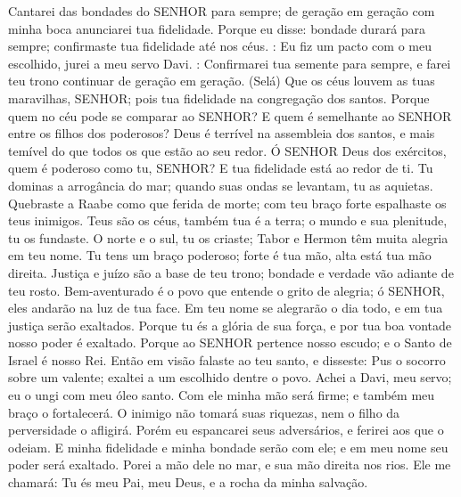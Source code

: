 
{\PP 
  Cantarei das bondades do SENHOR para sempre; de geração em geração com minha boca anunciarei tua fidelidade.
  Porque eu disse:
{} bondade durará para sempre; confirmaste tua fidelidade até nos céus.
   : Eu fiz um pacto com o meu escolhido, jurei a meu servo Davi.
{} :
  Confirmarei tua semente para sempre, e farei teu trono continuar de geração em geração. (Selá)
  Que os céus louvem as tuas maravilhas, SENHOR; pois tua fidelidade
{} na congregação dos santos.
  Porque quem no céu pode se comparar ao SENHOR? E quem é semelhante ao SENHOR entre os filhos dos poderosos?
  Deus é terrível na assembleia dos santos, e mais temível do que todos os que estão ao seu redor.
  Ó SENHOR Deus dos exércitos, quem é poderoso como tu, SENHOR? E tua fidelidade está ao redor de ti.
  Tu dominas a arrogância do mar; quando suas ondas se levantam, tu as aquietas.
  Quebraste a Raabe como que ferida de morte; com teu braço forte espalhaste os teus inimigos.
  Teus são os céus, também tua é a terra; o mundo e sua plenitude, tu os fundaste.
  O norte e o sul, tu os criaste; Tabor e Hermon têm muita alegria em teu nome.
  Tu tens um braço poderoso; forte é tua mão,
{} alta está tua mão direita.
  Justiça e juízo são a base de teu trono; bondade e verdade vão adiante de teu rosto.
  Bem-aventurado é o povo que entende o grito de alegria; ó SENHOR, eles andarão na luz de tua face.
  Em teu nome se alegrarão o dia todo, e em tua justiça serão exaltados.
  Porque tu és a glória de sua força, e por tua boa vontade nosso poder é exaltado.
  Porque ao SENHOR pertence nosso escudo; e o Santo de Israel é nosso Rei.
  Então em visão falaste ao teu santo, e disseste: Pus o socorro sobre um valente; exaltei a um escolhido dentre o povo.
  Achei a Davi, meu servo; eu o ungi com meu óleo santo.
  Com ele minha mão será firme; e também meu braço o fortalecerá.
  O inimigo não tomará suas riquezas, nem o filho da perversidade o afligirá.
  Porém eu espancarei seus adversários, e ferirei aos que o odeiam.
  E minha fidelidade e minha bondade serão com ele; e em meu nome seu poder será exaltado.
  Porei a mão dele no mar, e sua mão direita nos rios.
  Ele me chamará: Tu és meu Pai, meu Deus, e a rocha da minha salvação.
}
